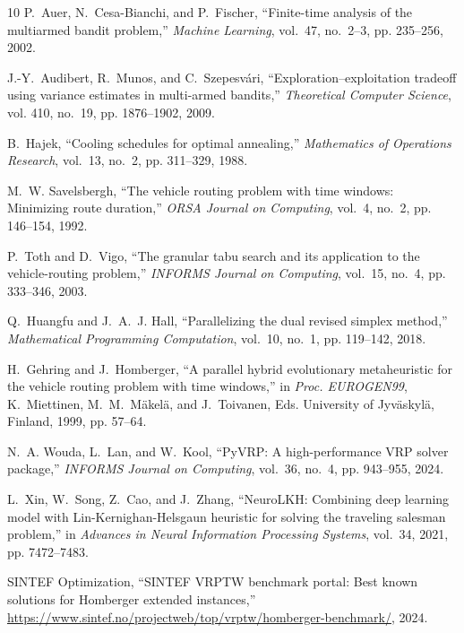 \documentclass{ieeeaccess}
\begin{document}
{\begin{thebibliography}{10}
P.~Auer, N.~Cesa-Bianchi, and P.~Fischer, ``Finite-time analysis of the multiarmed bandit problem,'' \emph{Machine Learning}, vol.~47, no.~2--3, pp. 235--256, 2002.

J.-Y.~Audibert, R.~Munos, and C.~Szepesv{\'a}ri, ``Exploration--exploitation tradeoff using variance estimates in multi-armed bandits,'' \emph{Theoretical Computer Science}, vol. 410, no.~19, pp. 1876--1902, 2009.

B.~Hajek, ``Cooling schedules for optimal annealing,'' \emph{Mathematics of Operations Research}, vol.~13, no.~2, pp. 311--329, 1988.

M.~W. Savelsbergh, ``The vehicle routing problem with time windows: Minimizing route duration,'' \emph{ORSA Journal on Computing}, vol.~4, no.~2, pp. 146--154, 1992.

P.~Toth and D.~Vigo, ``The granular tabu search and its application to the vehicle-routing problem,'' \emph{INFORMS Journal on Computing}, vol.~15, no.~4, pp. 333--346, 2003.

Q.~Huangfu and J.~A.~J. Hall, ``Parallelizing the dual revised simplex method,'' \emph{Mathematical Programming Computation}, vol.~10, no.~1, pp. 119--142, 2018.

H.~Gehring and J.~Homberger, ``A parallel hybrid evolutionary metaheuristic for the vehicle routing problem with time windows,'' in \emph{Proc. EUROGEN99}, K.~Miettinen, M.~M.~M{\"a}kel{\"a}, and J.~Toivanen, Eds. University of Jyv{\"a}skyl{\"a}, Finland, 1999, pp. 57--64.

N.~A. Wouda, L.~Lan, and W.~Kool, ``{PyVRP}: A high-performance {VRP} solver package,'' \emph{INFORMS Journal on Computing}, vol.~36, no.~4, pp. 943--955, 2024.

L.~Xin, W.~Song, Z.~Cao, and J.~Zhang, ``{NeuroLKH}: Combining deep learning model with {Lin-Kernighan-Helsgaun} heuristic for solving the traveling salesman problem,'' in \emph{Advances in Neural Information Processing Systems}, vol.~34, 2021, pp. 7472--7483.

{SINTEF Optimization}, ``{SINTEF} {VRPTW} benchmark portal: Best known solutions for Homberger extended instances,'' \url{https://www.sintef.no/projectweb/top/vrptw/homberger-benchmark/}, 2024.
\end{thebibliography}
}
\end{document}
